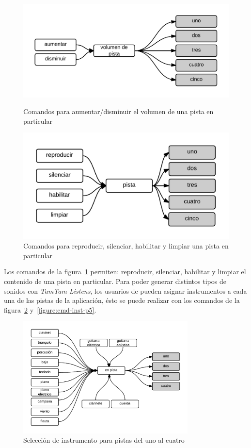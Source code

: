 \begin{figure}[H] 
\begin{minipage}[b]{0.5\linewidth}
\centering
\includegraphics[width=0.8\linewidth]{./graphics/vol-pista.png}
\caption{Comandos para aumentar/disminuir el volumen de una pista en particular}
\label{figure:cmd-vol-pista}
\end{minipage}
\quad
\begin{minipage}[b]{0.5\linewidth}
\centering
\includegraphics[width=0.9\linewidth]{./graphics/rep-pista.png}
\caption{Comandos para reproducir, silenciar, habilitar y limpiar una pista en particular}
\label{figure:cmd-rep-pista}
\end{minipage}
\end{figure}

Los comandos de la figura~\ref{figure:cmd-rep-pista} permiten: reproducir, silenciar, habilitar y limpiar el contenido de una
pista en particular. Para poder generar distintos tipos de sonidos con \emph{TamTam Listens}, los usuarios de pueden asignar
instrumentos a cada una de las pistas de
la aplicaci\'on, \'esto se puede realizar con los comandos de la figura~\ref{figure:cmd-inst-p1-4} y~\ref{figure:cmd-inst-p5}.


\begin{figure}[H]
\centering
\includegraphics[width=0.8\textwidth]{./graphics/inst-p1-4.png}
\caption{Selecci\'on de instrumento para pistas del uno al cuatro}
\label{figure:cmd-inst-p1-4}
\end{figure}

